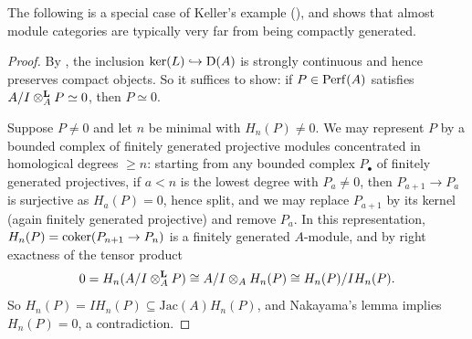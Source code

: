 
	The following is a special case of Keller's example (), and shows that almost module categories are typically very far from being compactly generated.

	\begin{proof}
		By , the inclusion $\ker(L) \hookrightarrow \operatorname{\mathrm{D}}(A)$ is strongly continuous and hence preserves compact objects. So it suffices to show: if $P \in \operatorname{Perf}(A)$ satisfies $A/I \otimes^{\mathbf{L}}_A P \simeq 0$, then $P \simeq 0$.

		Suppose $P \neq 0$ and let $n$ be minimal with $H_n(P) \neq 0$. We may represent $P$ by a bounded complex of finitely generated projective modules concentrated in homological degrees $\geq n$: starting from any bounded complex $P_\bullet$ of finitely generated projectives, if $a < n$ is the lowest degree with $P_a \neq 0$, then $P_{a+1} \to P_a$ is surjective as $H_a(P) = 0$, hence split, and we may replace $P_{a+1}$ by its kernel (again finitely generated projective) and remove $P_a$. In this representation, $H_n(P) = \operatorname{coker}(P_{n+1} \to P_n)$ is a finitely generated $A$-module, and by right exactness of the tensor product
		\[
			0 = H_n(A/I \otimes^{\mathbf{L}}_A P) \cong A/I \otimes_A H_n(P) \cong H_n(P)/IH_n(P).
		\]
		So $H_n(P) = IH_n(P) \subseteq \mathrm{Jac}(A)H_n(P)$, and Nakayama's lemma implies $H_n(P) = 0$, a contradiction.
	\end{proof}

